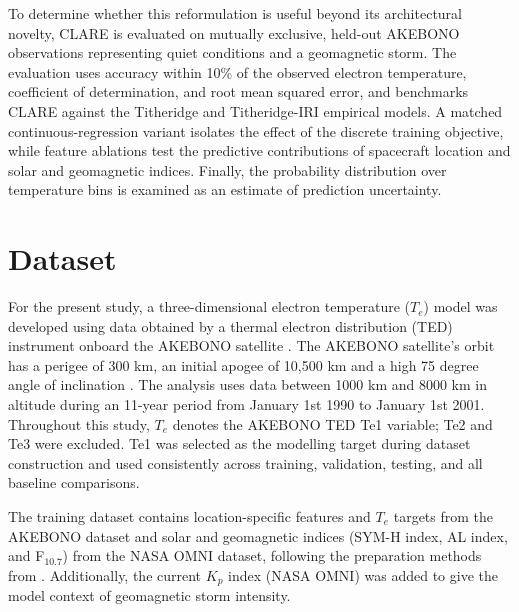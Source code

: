 \documentclass{agujournal2019}
\begin{document}
To determine whether this reformulation is useful beyond its architectural novelty, CLARE is evaluated on mutually exclusive, held-out AKEBONO observations representing quiet conditions and a geomagnetic storm. The evaluation uses accuracy within 10\% of the observed electron temperature, coefficient of determination, and root mean squared error, and benchmarks CLARE against the Titheridge and Titheridge-IRI empirical models. A matched continuous-regression variant isolates the effect of the discrete training objective, while feature ablations test the predictive contributions of spacecraft location and solar and geomagnetic indices. Finally, the probability distribution over temperature bins is examined as an estimate of prediction uncertainty.

\section{Dataset}
\label{data}

For the present study, a three-dimensional electron temperature ($T_e$) model was developed using data obtained by a thermal electron distribution (TED) instrument onboard the AKEBONO satellite \citep{abe_measurements_1990}. The AKEBONO satellite's orbit has a perigee of 300 km, an initial apogee of 10,500 km and a high 75 degree angle of inclination \citep{tsuruda_introduction_1993}. The analysis uses data between 1000 km and 8000 km in altitude during an 11-year period from January 1st 1990 to January 1st 2001. Throughout this study, $T_e$ denotes the AKEBONO TED Te1 variable; Te2 and Te3 were excluded. Te1 was selected as the modelling target during dataset construction and used consistently across training, validation, testing, and all baseline comparisons.

The training dataset contains location-specific features and $T_e$ targets from the AKEBONO dataset and solar and geomagnetic indices (SYM-H index, AL index, and F$_{10.7}$) from the NASA OMNI dataset, following the preparation methods from \cite{chu_neural_2017}. Additionally, the current $K_p$ index (NASA OMNI) was added to give the model context of geomagnetic storm intensity.
\end{document}
